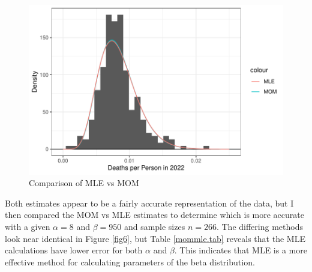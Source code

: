 \documentclass{article}\usepackage[]{graphicx}\usepackage[]{xcolor}
\begin{document}
\begin{multicols}{2}
\begin{figure}[H]
 \begin{center}
 \includegraphics[scale=0.45]{estimator_comparison.pdf}
 \caption{Comparison of MLE vs MOM}
 \label{fig5}
 \end{center}
 \end{figure}
 
Both estimates appear to be a fairly accurate representation of the data, but I then compared the MOM vs MLE estimates to determine which is more accurate with a given $\alpha=8$ and $\beta=950$ and sample sizes $n=266$. The differing methods look near identical in Figure \ref{fig6}, but Table \ref{mommle.tab} reveals that the MLE calculations have lower error for both $\alpha$ and $\beta$. This indicates that MLE is a more effective method for calculating parameters of the beta distribution.
 

\end{multicols}
\end{document}
